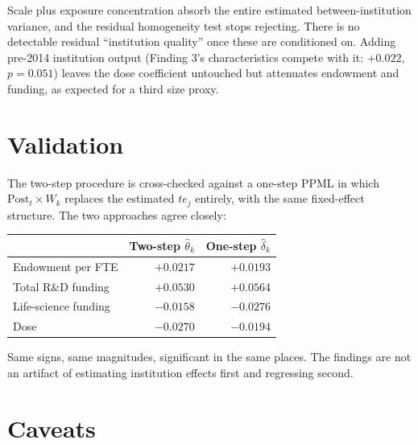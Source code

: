 \documentclass[11pt]{article}
\newcommand{\Post}{\mathrm{Post}}
\begin{document}
\noindent
Scale plus exposure concentration absorb the entire estimated between-institution
variance, and the residual homogeneity test stops rejecting. There is no
detectable residual ``institution quality'' once these are conditioned on.
Adding pre-2014 institution output (Finding 3's characteristics compete with
it: $+0.022$, $p = 0.051$) leaves the dose coefficient untouched but
attenuates endowment and funding, as expected for a third size proxy.

\section{Validation}

The two-step procedure is cross-checked against a one-step PPML in which
$\Post_t \times W_k$ replaces the estimated $te_j$ entirely, with the same
fixed-effect structure. The two approaches agree closely:

\begin{center}
\begin{tabular}{@{}lrr@{}}
\toprule
 & Two-step $\hat\theta_k$ & One-step $\hat\delta_k$ \\
\midrule
Endowment per FTE    & $+0.0217$ & $+0.0193$ \\
Total R\&D funding   & $+0.0530$ & $+0.0564$ \\
Life-science funding & $-0.0158$ & $-0.0276$ \\
Dose                 & $-0.0270$ & $-0.0194$ \\
\bottomrule
\end{tabular}
\end{center}

\noindent
Same signs, same magnitudes, significant in the same places. The findings are
not an artifact of estimating institution effects first and regressing second.

\section{Caveats}
\end{document}
